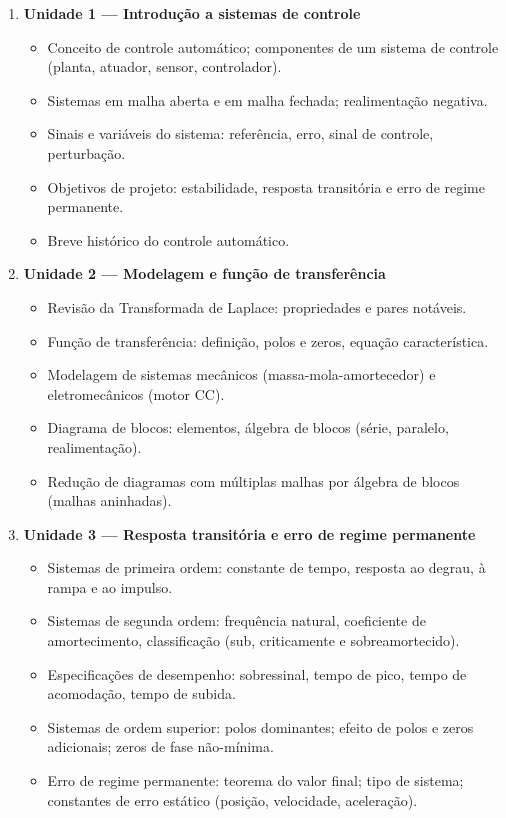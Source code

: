 \documentclass[oneside,a4paper,12pt]{article}
\begin{document}
  \begin{enumerate}
    \item \textbf{Unidade 1 --- Introdução a sistemas de controle}
    \begin{itemize}
      \item Conceito de controle automático; componentes de um sistema de controle (planta, atuador, sensor, controlador).
      \item Sistemas em malha aberta e em malha fechada; realimentação negativa.
      \item Sinais e variáveis do sistema: referência, erro, sinal de controle, perturbação.
      \item Objetivos de projeto: estabilidade, resposta transitória e erro de regime permanente.
      \item Breve histórico do controle automático.
    \end{itemize}

    \item \textbf{Unidade 2 --- Modelagem e função de transferência}
    \begin{itemize}
      \item Revisão da Transformada de Laplace: propriedades e pares notáveis.
      \item Função de transferência: definição, polos e zeros, equação característica.
      \item Modelagem de sistemas mecânicos (massa-mola-amortecedor) e eletromecânicos (motor CC).
      \item Diagrama de blocos: elementos, álgebra de blocos (série, paralelo, realimentação).
      \item Redução de diagramas com múltiplas malhas por álgebra de blocos (malhas aninhadas).
    \end{itemize}

    \item \textbf{Unidade 3 --- Resposta transitória e erro de regime permanente}
    \begin{itemize}
      \item Sistemas de primeira ordem: constante de tempo, resposta ao degrau, à rampa e ao impulso.
      \item Sistemas de segunda ordem: frequência natural, coeficiente de amortecimento, classificação (sub, criticamente e sobreamortecido).
      \item Especificações de desempenho: sobressinal, tempo de pico, tempo de acomodação, tempo de subida.
      \item Sistemas de ordem superior: polos dominantes; efeito de polos e zeros adicionais; zeros de fase não-mínima.
      \item Erro de regime permanente: teorema do valor final; tipo de sistema; constantes de erro estático (posição, velocidade, aceleração).
    \end{itemize}


\end{enumerate}
\end{document}
